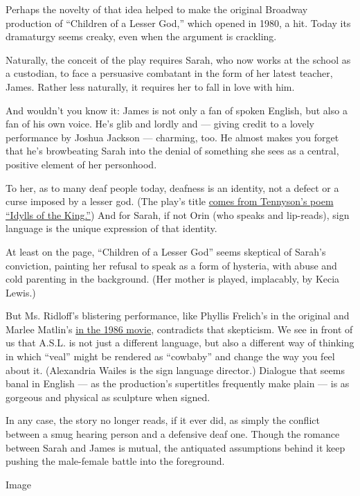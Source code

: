 Perhaps the novelty of that idea helped to make the original Broadway
production of ``Children of a Lesser God,'' which opened in 1980, a hit.
Today its dramaturgy seems creaky, even when the argument is crackling.

Naturally, the conceit of the play requires Sarah, who now works at the
school as a custodian, to face a persuasive combatant in the form of her
latest teacher, James. Rather less naturally, it requires her to fall in
love with him.

And wouldn't you know it: James is not only a fan of spoken English, but
also a fan of his own voice. He's glib and lordly and --- giving credit
to a lovely performance by Joshua Jackson --- charming, too. He almost
makes you forget that he's browbeating Sarah into the denial of
something she sees as a central, positive element of her personhood.

To her, as to many deaf people today, deafness is an identity, not a
defect or a curse imposed by a lesser god. (The play's title
\href{https://www.poetryfoundation.org/poems/45325/idylls-of-the-king-the-passing-of-arthur}{comes
from Tennyson's poem ``Idylls of the King.''}) And for Sarah, if not
Orin (who speaks and lip-reads), sign language is the unique expression
of that identity.

At least on the page, ``Children of a Lesser God'' seems skeptical of
Sarah's conviction, painting her refusal to speak as a form of hysteria,
with abuse and cold parenting in the background. (Her mother is played,
implacably, by Kecia Lewis.)

But Ms. Ridloff's blistering performance, like Phyllis Frelich's in the
original and Marlee Matlin's
\href{https://www.youtube.com/watch?v=E0AMKG31wME}{in the 1986 movie},
contradicts that skepticism. We see in front of us that A.S.L. is not
just a different language, but also a different way of thinking in which
``veal'' might be rendered as ``cowbaby'' and change the way you feel
about it. (Alexandria Wailes is the sign language director.) Dialogue
that seems banal in English --- as the production's supertitles
frequently make plain --- is as gorgeous and physical as sculpture when
signed.

In any case, the story no longer reads, if it ever did, as simply the
conflict between a smug hearing person and a defensive deaf one. Though
the romance between Sarah and James is mutual, the antiquated
assumptions behind it keep pushing the male-female battle into the
foreground.

Image

